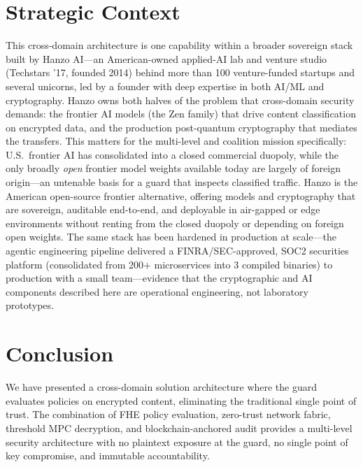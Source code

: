 \documentclass[11pt,letterpaper]{article}
\begin{document}
\section{Strategic Context}

This cross-domain architecture is one capability within a broader sovereign stack built by Hanzo AI---an American-owned applied-AI lab and venture studio (Techstars '17, founded 2014) behind more than 100 venture-funded startups and several unicorns, led by a founder with deep expertise in both AI/ML and cryptography. Hanzo owns both halves of the problem that cross-domain security demands: the frontier AI models (the Zen family) that drive content classification on encrypted data, and the production post-quantum cryptography that mediates the transfers. This matters for the multi-level and coalition mission specifically: U.S.\ frontier AI has consolidated into a closed commercial duopoly, while the only broadly \emph{open} frontier model weights available today are largely of foreign origin---an untenable basis for a guard that inspects classified traffic. Hanzo is the American open-source frontier alternative, offering models and cryptography that are sovereign, auditable end-to-end, and deployable in air-gapped or edge environments without renting from the closed duopoly or depending on foreign open weights. The same stack has been hardened in production at scale---the agentic engineering pipeline delivered a FINRA/SEC-approved, SOC2 securities platform (consolidated from 200+ microservices into 3 compiled binaries) to production with a small team---evidence that the cryptographic and AI components described here are operational engineering, not laboratory prototypes.

\section{Conclusion}

We have presented a cross-domain solution architecture where the guard evaluates policies on encrypted content, eliminating the traditional single point of trust. The combination of FHE policy evaluation, zero-trust network fabric, threshold MPC decryption, and blockchain-anchored audit provides a multi-level security architecture with no plaintext exposure at the guard, no single point of key compromise, and immutable accountability.
\end{document}
